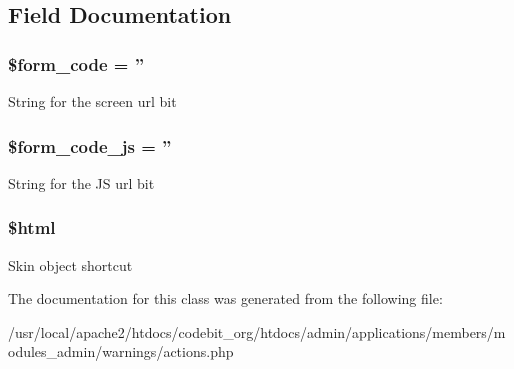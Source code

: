 \subsection{Field Documentation}
\hypertarget{classadmin__members__warnings__actions_af28aee726fa3eb6c355d08a2ab655e03}{
\subsubsection[{\$form\-\_\-code}]{\setlength{\rightskip}{0pt plus 5cm}\$form\-\_\-code = ''}}\label{classadmin__members__warnings__actions_af28aee726fa3eb6c355d08a2ab655e03}
String for the screen url bit \hypertarget{classadmin__members__warnings__actions_ac68fe8a02a2efd63c3271179f4b4fbb7}{
\subsubsection[{\$form\-\_\-code\-\_\-js}]{\setlength{\rightskip}{0pt plus 5cm}\$form\-\_\-code\-\_\-js = ''}}\label{classadmin__members__warnings__actions_ac68fe8a02a2efd63c3271179f4b4fbb7}
String for the J\-S url bit \hypertarget{classadmin__members__warnings__actions_a6f96e7fc92441776c9d1cd3386663b40}{
\subsubsection[{\$html}]{\setlength{\rightskip}{0pt plus 5cm}\$html}}\label{classadmin__members__warnings__actions_a6f96e7fc92441776c9d1cd3386663b40}
Skin object shortcut 

The documentation for this class was generated from the following file\-:\begin{DoxyCompactItemize}
\item 
/usr/local/apache2/htdocs/codebit\-\_\-org/htdocs/admin/applications/members/modules\-\_\-admin/warnings/actions.\-php\end{DoxyCompactItemize}
